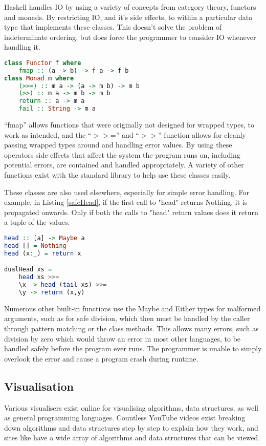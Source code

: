 Haskell handles IO by using a variety of concepts from category theory, functors and monads. By restricting IO, and it's side effects, to within a particular data type that implements these classes. This doesn't solve the problem of indeterminate ordering, but does force the programmer to consider IO whenever handling it.
\begin{lstlisting}[language=Haskell,caption={The Functor and Monad typeclass.\protect\footnotemark.}]
class Functor f where
    fmap :: (a -> b) -> f a -> f b
class Monad m where
    (>>=) :: m a -> (a -> m b) -> m b
    (>>) :: m a -> m b -> m b
    return :: a -> m a
    fail :: String -> m a
\end{lstlisting}
``fmap'' allows functions that were originally not designed for wrapped types, to work as intended, and the ``$>>$='' and ``$>>$'' function allows for cleanly passing wrapped types around and handling error values.
By using these operators side effects that affect the system the program runs on, including potential errors, are contained and handled appropriately. A variety of other functions exist with the standard library to help use these classes easily.

These classes are also used elsewhere, especially for simple error handling. For example, in Listing \ref{safeHead}, if the first call to "head" returns Nothing, it is propagated onwards. Only if both the calls to "head" return values does it return a tuple of the values.
\begin{lstlisting}[language=Haskell, caption=Safely fetch the first two elements of a list., label=safeHead]
head :: [a] -> Maybe a
head [] = Nothing
head (x:_) = return x

dualHead xs =
    head xs >>=
    \x -> head (tail xs) >>=
    \y -> return (x,y)
\end{lstlisting}
Numerous other built-in functions use the Maybe and Either types for malformed arguments, such as for safe division, which then must be handled by the caller through pattern matching or the class methods. This allows many errors, such as division by zero which would throw an error in most other languages, to be handled safely before the program ever runs. The programmer is unable to simply overlook the error and cause a program crash during runtime.

\subsection{Visualisation}
\label{visualisationsection}
Various visualisers exist online for visualising algorithms, data structures, as well as general programming languages. Countless YouTube videos exist breaking down algorithms and data structures step by step to explain how they work, and sites like \cite{algo-vis} have a wide array of algorithms and data structures that can be viewed.

